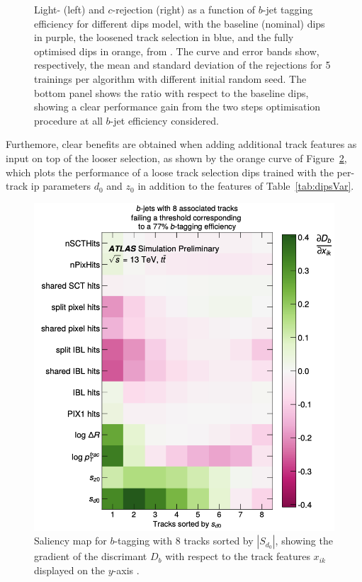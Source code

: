 \begin{figure}[h!]
\begin{subfigure}[b]{0.48\textwidth}
      \label{fig:dipsOptRocC}
  \end{subfigure}
  \caption{Light- (left) and $c$-rejection (right) as a function of $b$-jet tagging efficiency for different \gls{dips} model, with the baseline (nominal) \gls{dips} in purple, the loosened track selection in blue, and the fully optimised \gls{dips} in orange, from \cite{ATL-PHYS-PUB-2020-014}. The curve and error bands show, respectively, the mean and standard deviation of the rejections for 5 trainings per algorithm with different initial random seed. The bottom panel shows the ratio with respect to the baseline \gls{dips}, showing a clear performance gain from the two steps optimisation procedure at all $b$-jet efficiency considered.}
  \label{fig:dipsOptRoc}
\end{figure} 

Furthemore, clear benefits are obtained when adding additional track features as input on top of the looser selection, as shown by the orange curve of Figure~\ref{fig:dipsOptRoc}, which plots the performance of a loose track selection \gls{dips} trained with the per-track \gls{ip} parameters $d_0$ and $z_0$ in addition to the features of Table~\ref{tab:dipsVar}.

\begin{figure}[h!]
  \center
  \begin{minipage}[c]{0.7\textwidth}
    \includegraphics[width=\textwidth]{Images/FTAG/dipsSaliency.png}
  \end{minipage}
  \begin{minipage}[c]{0.25\textwidth}
    \caption{Saliency map for $b$-tagging with 8 tracks sorted by $|S_{d_0}|$, showing the gradient of the discrimant $D_b$ with respect to the track features $x_{ik}$ displayed on the $y$-axis \cite{ATL-PHYS-PUB-2020-014}.} 
  \label{fig:dipsSaliency}
  \end{minipage}
\end{figure}

